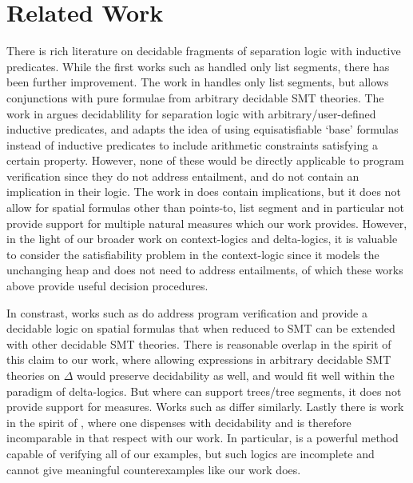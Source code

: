 \section{Related Work}
There is rich literature on decidable fragments of separation logic \cite{Reynolds2002} with inductive predicates. While the first works such as  \cite{BerdineCalcagnoO'Hearn2004, BerdineCalcagnoO'Hearn2005, CookHaaseChristoph2011,PerezAntonioRybalchenko2011 } handled only list segments, there has been further improvement. The work in \cite{PerezRybalchenko2013} handles only list segments, but allows conjunctions with pure formulae from arbitrary decidable SMT theories. The work in \cite{BrotherstonFuhsPerez2014} argues decidablility for separation logic with arbitrary/user-defined inductive predicates, and \cite{LeTatsutaSun2017,LeSunChin2016 } adapts the idea of using equisatisfiable `base' formulas instead of inductive predicates to include arithmetic constraints satisfying a certain property. However, none of these would be directly applicable to program verification since they do not address entailment, and do not contain an implication in their logic.  The work in\cite{PerezRybalchenko2013} does contain implications, but it does not allow for spatial formulas other than points-to, list segment and in particular not provide support for multiple natural measures which our work provides. However, in the light of our broader work on context-logics and delta-logics, it is valuable to consider the satisfiability problem in the context-logic since it models the unchanging heap and does not need to address entailments, of which these works above provide useful decision procedures.

In constrast, works such as \cite{PiskacWiesZufferey2014, PiskacWiesZufferey2014Tool} do address program verification and provide a decidable logic on spatial formulas that when reduced to SMT can be extended with other decidable SMT theories. There is reasonable overlap in the spirit of this claim to our work, where allowing expressions in arbitrary decidable SMT theories on $\Delta{}$  would preserve decidability as well, and would fit well within the paradigm of delta-logics. But where \cite{PiskacWiesZufferey2014} can support trees/tree segments, it does not provide support for measures. Works such as\cite{MadhusudanParlatoQiu2011, IosifRogalewiczSimacek2013} differ similarly. %
Lastly there is work in the spirit of \cite{ChinDavidNguyen2007, QiuGargStefanescu2013}, where one dispenses with decidability and is therefore incomparable in that respect with our work. In particular, \cite{QiuGargStefanescu2013} is a powerful method capable of verifying all of our examples, but such logics are incomplete and cannot give meaningful counterexamples like our work does.
